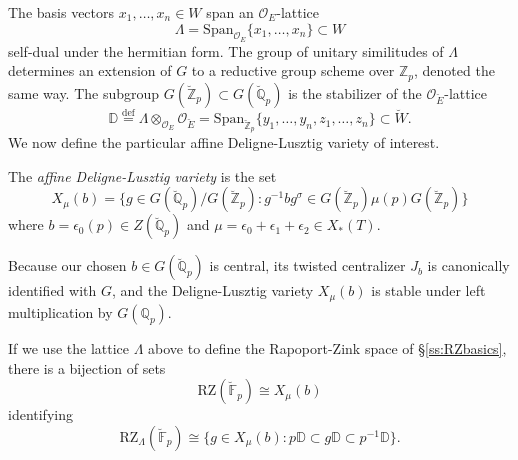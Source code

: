 \documentclass[11pt]{alggeom}
\newcommand{\iso}{\cong}
\newcommand{\define}{\stackrel{\mathrm{def}}{=}}
\newcommand{\Q}{\mathbb Q}
\newcommand{\Z}{\mathbb Z}
\newcommand{\F}{\mathbb F}
\newcommand{\co}{\mathcal O}
\begin{document}
The basis vectors $x_1,\ldots, x_n \in W$ span an $\co_E$-lattice 
\[
\Lambda = \mathrm{Span}_{\co_E}\{ x_1,\ldots, x_n\} \subset W
\]
self-dual under the hermitian form.
The group of unitary similitudes of $\Lambda$ determines an extension of $G$ to a reductive group scheme over $\Z_p$, denoted the same way.
The subgroup $G(\breve{\Z}_p) \subset G(\breve{\Q}_p)$ is the stabilizer of the $\co_{\breve{E}}$-lattice
\begin{equation}\label{ADLlattices}
\mathbb{D} \define \Lambda\otimes_{\co_E} \co_{\breve{E}} =
  \mathrm{Span}_{\breve{\Z}_p} \{y_1,\ldots, y_n,z_1,\ldots, z_n   \}  \subset \breve{W}.
\end{equation}
We now define the particular affine Deligne-Lusztig variety of interest.





\begin{definition}
The \emph{affine Deligne-Lusztig variety} is the set 
\[
X_\mu(b)   = \{ g \in G(\breve{\Q}_p) / G(\breve{\Z}_p) : g^{-1}  b g^\sigma \in  G(\breve{\Z}_p) \mu(p) G(\breve{\Z}_p) \}  
\]
where  $b = \epsilon_0(p) \in Z(\breve{\Q}_p)$ and 
$
 \mu = \epsilon_0+\epsilon_1+\epsilon_2 \in X_*(T) .
$
\end{definition}



 
 


\begin{remark}\label{rem:central b}
Because our chosen $b\in G(\breve{\Q}_p)$ is central, its twisted centralizer $J_b$ is canonically identified with $G$, and 
the Deligne-Lusztig variety $X_\mu(b)$ is stable under left multiplication by $G(\Q_p)$.
\end{remark}

 
 
 


\begin{proposition}\label{prop:DLtoRZ}
If we use the lattice $\Lambda$ above  to define the Rapoport-Zink space  of  \S \ref{ss:RZbasics},
there is a bijection of sets
\[
\mathrm{RZ}(\breve{\F}_p) \iso X_\mu(b) 
\]
identifying
\[
\mathrm{RZ}_\Lambda(\breve{\F}_p) \iso \{ g\in X_\mu(b) :   p \mathbb{D} \subset  g \mathbb{D} \subset p^{-1} \mathbb{D} \}.
\]
\end{proposition}
\end{document}
